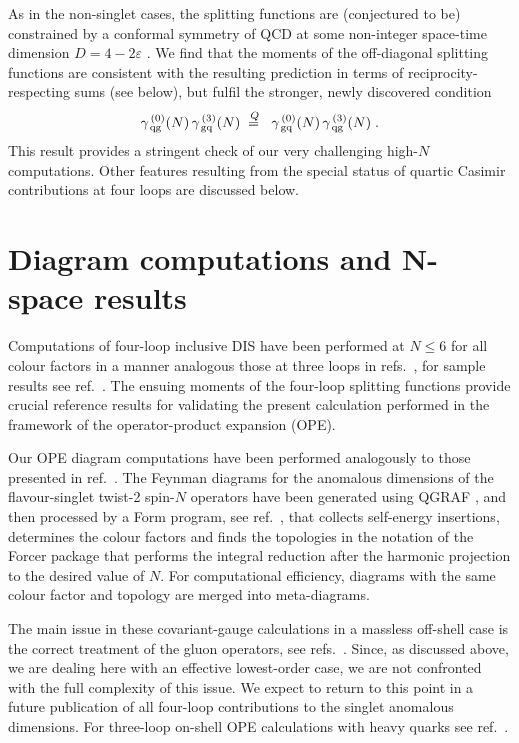 \documentclass[12pt]{article}
\newcommand{\Qeq}{\raisebox{-0.1mm}{$\:\!\stackrel{Q_{\phantom{i\!\!\!\!}}}{=}\:\:$}}
\newcommand{\beq}{\begin{equation}}
\newcommand{\eeq}{\end{equation}}
\newcommand{\ep}{\varepsilon}
\begin{document}
As in the non-singlet cases, the splitting functions are (conjectured to be)
constrained by a conformal symmetry of QCD at some non-integer space-time
dimension $D = 4 - 2 \ep$ \cite{BassoK06}. We find that the moments of the
off-diagonal splitting functions are consistent with the resulting prediction
in terms of reciprocity-respecting sums (see below), but fulfil the stronger, 
newly discovered condition
%
\beq
\label{Qoffd}
  \gamma_{\,\rm qg}^{\,(0)}(N) \,\gamma_{\,\rm gq}^{\,(3)}(N) 
  \;\:\Qeq\:\:
  \gamma_{\,\rm gq}^{\,(0)}(N) \,\gamma_{\,\rm qg}^{\,(3)}(N) 
\; .
\eeq
%
This result provides a stringent check of our very challenging high-$N$
computations. Other features resulting from the special status of 
quartic Casimir contributions at four loops are discussed below.

%
\setcounter{equation}{0}
\section{Diagram computations and $\bm N\!$-space results}
\label{sec:calcn}
\vspace*{-1mm}

Computations of four-loop inclusive DIS have been performed at $N\!\leq\!6$
for all colour factors in a manner analogous those at three loops in 
refs.~\cite{dis3moms}, for sample results see ref.~\cite{avLL16}. 
The ensuing moments of the four-loop splitting functions provide crucial
reference results for validating the present calculation performed in the 
framework of the operator-product expansion (OPE).
 
Our OPE diagram computations have been performed analogously to those 
presented in ref.~\cite{MRUVV1}.
The Feynman diagrams for the anomalous dimensions of the flavour-singlet
twist-2 spin-$N$ operators have been generated using QGRAF \cite{QGRAF}, and 
then processed by a {\sc Form} \cite{FORM} program, see ref.~\cite{jvLL2016}, 
that collects self-energy insertions, determines the colour factors and finds 
the topologies in the notation of the {\sc Forcer} package \cite{Forcer} that
performs the integral reduction after the harmonic projection \cite{MincForm}
to the desired value of $N$. For computational efficiency, diagrams with the 
same colour factor and topology are merged into meta-diagrams.

The main issue in these covariant-gauge calculations in a massless off-shell
case is the correct treatment of the gluon operators, 
see refs.~\cite{GluonOps}.
Since, as discussed above, we are dealing here with an effective lowest-order 
case, we are not confronted with the full complexity of this issue. 
We expect to return to this point in a future publication of all four-loop
contributions to the singlet anomalous dimensions. For three-loop on-shell 
OPE calculations with heavy quarks see ref.~\cite{BBK09}.
\end{document}
